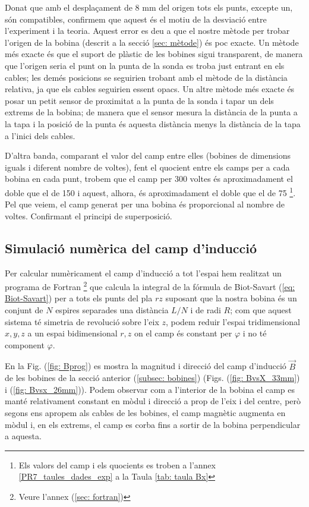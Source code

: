 \documentclass[11pt]{article}
\numberwithin{equation}{section}
\numberwithin{figure}{section}
\numberwithin{table}{section}
\begin{document}
Donat que amb el desplaçament de 8 mm del origen tots els punts, excepte un, són compatibles, confirmem que aquest és el motiu de la desviació entre l'experiment i la teoria. Aquest error es deu a que el nostre mètode per trobar l'origen de la bobina (descrit a la secció \ref{sec: mètode}) és poc exacte. Un mètode més exacte és que el suport de plàstic de les bobines sigui transparent, de manera que l'origen seria el punt on la punta de la sonda es troba just entrant en els cables; les demés posicions se seguirien trobant amb el mètode de la distància relativa, ja que els cables seguirien essent opacs. Un altre mètode més exacte és posar un petit sensor de proximitat a la punta de la sonda i tapar un dels extrems de la bobina; de manera que el sensor mesura la distància de la punta a la tapa i la posició de la punta és aquesta distància menys la distància de la tapa a l'inici dels cables.

D'altra banda, comparant el valor del camp entre elles (bobines de dimensions iguals i diferent nombre de voltes), fent el quocient entre els camps per a cada bobina en cada punt, trobem que el camp per 300 voltes és aproximadament el doble que el de 150 i aquest, alhora, és aproximadament el doble que el de 75 \footnote{Els valors del camp i els quocients es troben a l'annex \ref{PR7_taules_dades_exp} a la Taula \ref{tab: taula Bx}}. Pel que veiem, el camp generat per una bobina és proporcional al nombre de voltes. Confirmant el principi de superposició.

\subsection{Simulació numèrica del camp d'inducció} \label{sec: programa}
Per calcular numèricament el camp d'inducció a tot l'espai hem realitzat un programa de Fortran \footnote{Veure l'annex (\ref{sec: fortran})} que calcula la integral de la fórmula de Biot-Savart (\ref{eq: Biot-Savart}) per a tots els punts del pla $rz$ suposant que la nostra bobina és un conjunt de $N$ espires separades una distància $L/N$ i de radi $R$; com que aquest sistema té simetria de revolució sobre l'eix $z$, podem reduir l'espai tridimensional $x, y, z$ a un espai bidimensional $r, z$ on el camp és constant per $\varphi$ i no té component $\varphi$.

En la Fig. (\ref{fig: Bprog}) es mostra la magnitud i direcció del camp d'inducció $\vec{B}$ de les bobines de la secció anterior (\ref{subsec: bobines}) (Figs. (\ref{fig: BvsX_33mm}) i (\ref{fig: Bvsx_26mm})). Podem observar com a l'interior de la bobina el camp es manté relativament constant en mòdul i direcció a prop de l'eix i del centre, però segons ens apropem als cables de les bobines, el camp magnètic augmenta en mòdul i, en els extrems, el camp es corba fins a sortir de la bobina perpendicular a aquesta.
\end{document}

